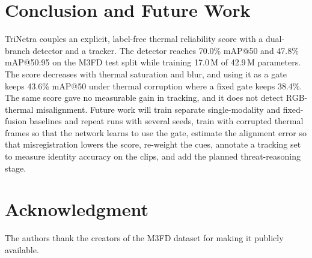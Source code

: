 \documentclass[journal]{IEEEtran}
\begin{document}
\section{Conclusion and Future Work}\label{sec:conclusion}
TriNetra couples an explicit, label-free thermal reliability score with a dual-branch detector and a tracker. The detector reaches 70.0\% mAP@50 and 47.8\% mAP@50:95 on the M3FD test split while training 17.0\,M of 42.9\,M parameters. The score decreases with thermal saturation and blur, and using it as a gate keeps 43.6\% mAP@50 under thermal corruption where a fixed gate keeps 38.4\%. The same score gave no measurable gain in tracking, and it does not detect RGB-thermal misalignment. Future work will train separate single-modality and fixed-fusion baselines and repeat runs with several seeds, train with corrupted thermal frames so that the network learns to use the gate, estimate the alignment error so that misregistration lowers the score, re-weight the cues, annotate a tracking set to measure identity accuracy on the clips, and add the planned threat-reasoning stage.

\section*{Acknowledgment}
The authors thank the creators of the M3FD dataset for making it publicly available.
\end{document}
